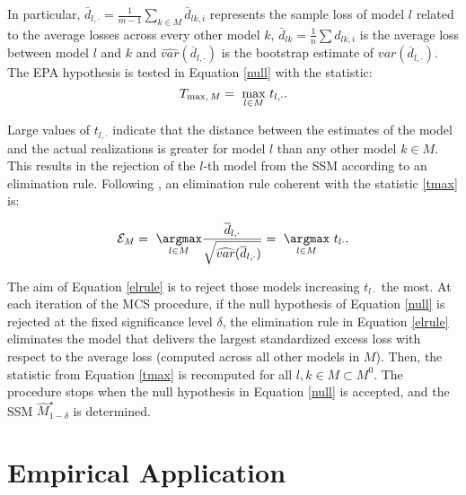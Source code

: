 In particular, $\bar{d}_{l, \cdot} = \frac{1}{m-1} \sum_{k \in M} \bar{d}_{lk,i}$ represents the sample loss of model $l$ related to the average losses across every other model $k$,
$\bar{d}_{lk} = \frac{1}{n} \sum d_{lk,i}$ is the average loss between model $l$ and $k$ and $\widehat{var}( \overline{d}_{l, \cdot})$ is the bootstrap estimate of ${var}( \overline{d}_{l, \cdot})$. 
The EPA hypothesis is tested in Equation \eqref{null} with the statistic: 
\begin{equation}\label{tmax}
	T_{\textnormal{max}, \, M} = \ \underset{l \in M}{\textnormal{max}} \,  \, t_{l, \cdot}.
\end{equation}

Large values of $t_{l, \cdot}$ indicate that the distance between the estimates of the model and the actual realizations is greater for model $l$ than any other model $k \in M$. This results in the rejection of the $l$-th model from the SSM according to an elimination rule. Following \cite{Hansen:Lunde:Nason:2011}, an elimination rule coherent with the statistic \eqref{tmax} is:

\begin{equation}\label{elrule}
	\mathcal{E}_{M} = \ \underset{l \in M}{\argmax} \frac{\overline{d}_{l, \cdot}}{\sqrt{\widehat{var}( \overline{d}_{l, \cdot})}} = \ \underset{l \in M}{\argmax}\,  \, t_{l \cdot}.
\end{equation}

The aim of Equation \eqref{elrule} is to reject those models increasing $t_{l \cdot}$ the most. At each iteration of the MCS procedure, if the null hypothesis of Equation \eqref{null} is rejected at the fixed significance level $\delta$, the elimination rule in Equation \eqref{elrule} eliminates the model that delivers the largest standardized excess loss with respect to the average loss (computed across all other models in $M$). Then, the statistic from Equation \eqref{tmax} is recomputed for all $l, k \in M\subset M^0$. The procedure stops when the null hypothesis in Equation \eqref{null} is accepted, and the SSM $\widehat{M}^\star_{1-\delta}$ is determined.


\section{Empirical Application}\label{sec:empirics}

